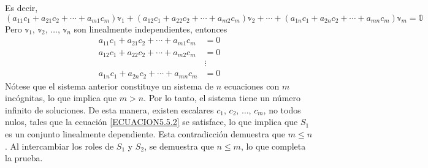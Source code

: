 \begin{theorem}
    Es decir,
    $$\left( a_{11}c_1 + a_{21}c_2 + \cdots + a_{m1}c_m \right)\mathbb{v}_1 + \left( a_{12}c_1 + a_{22}c_2 + \cdots + a_{m2}c_m \right)\mathbb{v}_2 + \cdots + \left( a_{1n}c_1 + a_{2n}c_2 + \cdots + a_{mn}c_m \right)\mathbb{v}_m = \mathbb{0}$$
    Pero $\mathbb{v}_1$, $\mathbb{v}_2$, $\dots$, $\mathbb{v}_n$ son linealmente independientes, entonces
    \begin{align*}
        a_{11}c_1 + a_{21}c_2 + \cdots + a_{m1}c_m & = 0 \\
        a_{12}c_1 + a_{22}c_2 + \cdots + a_{m2}c_m & = 0 \\
        & \vdots \\
        a_{1n}c_1 + a_{2n}c_2 + \cdots + a_{mn}c_m & = 0
    \end{align*}
    Nótese que el sistema anterior constituye un sistema de $n$ ecuaciones con $m$ incógnitas, lo que implica que $m > n$. Por lo tanto, el sistema tiene un número infinito de soluciones. De esta manera, existen escalares $c_1$, $c_2$, $\dots$, $c_m$, no todos nulos, tales que la ecuación \eqref{ECUACION5.5.2} se satisface, lo que implica que $S_1$ es un conjunto linealmente dependiente. Esta contradicción demuestra que $m \leq n$. Al intercambiar los roles de $S_1$ y $S_2$, se demuestra que $n \leq m$, lo que completa la prueba.
\end{theorem}

